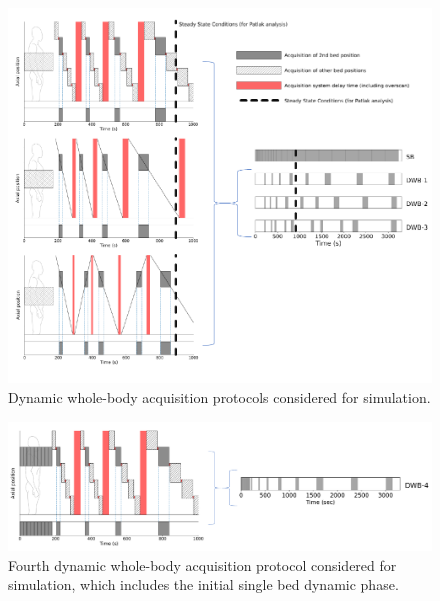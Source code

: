 \begin{figure} [ht!]
\centering
\includegraphics[scale=1.03,angle=0]{3_Results/3_2_Dynamic_Reconstruction_SimulationStudy/figures/protocols.pdf}
\caption{Dynamic whole-body acquisition protocols considered for simulation.} 
\label{fig:DWBprotocols}
\end{figure}

\begin{figure} [ht!]
\centering
\includegraphics[scale=0.52,angle=0]{3_Results/3_2_Dynamic_Reconstruction_SimulationStudy/figures/AdditionalProtocolDWB4.pdf}
\caption{Fourth dynamic whole-body acquisition protocol considered for simulation, which includes the initial single bed dynamic phase.} 
\label{fig:DWB4_Protocol}
\end{figure}

